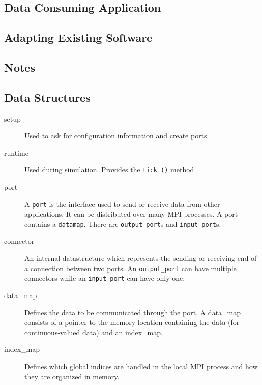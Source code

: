 \documentclass[a4paper]{report}
\begin{document}



\section{Data Consuming Application}




\begin{metatext}
\chapter{Adapting Existing Software}
\end{metatext}

\begin{metatext}
\chapter{Notes}

\section{Data Structures}

\begin{description}
  \item[setup] Used to ask for configuration information and create
    ports.
  \item[runtime] Used during simulation.  Provides the \lstinline|tick ()|
    method.
  \item[port] A \lstinline|port| is the interface used to send or receive
    data from other applications.  It can be distributed over many MPI
    processes.  A port contains a \lstinline|datamap|.  There are
    \lstinline|output_port|s and \lstinline|input_port|s.
  \item[connector] An internal datastructure which represents the
    sending or receiving end of a connection between two ports.  An
    \lstinline|output_port| can have multiple connectors while an
    \lstinline|input_port| can have only one.
  \item[data\_map] Defines the data to be communicated through the
    port.  A data\_map consists of a pointer to the memory location
    containing the data (for continuous-valued data) and an
    index\_map.
  \item[index\_map] Defines which global indices are handled in the
    local MPI process and how they are organized in memory.
\end{description}


\end{metatext}
\end{document}
